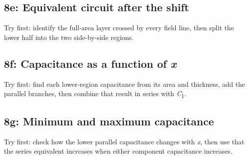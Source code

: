 \documentclass[11pt]{article}
\begin{document}
\begin{keepsection}
\begin{keepsection}
\subsection{8e: Equivalent circuit after the shift}

Try first: identify the full-area layer crossed by every field line, then split the lower half into the two side-by-side regions.

\end{keepsection}

\begin{keepsection}
\subsection{8f: Capacitance as a function of \textit{x}}

Try first: find each lower-region capacitance from its area and thickness, add the parallel branches, then combine that result in series with \textit{C}\textsubscript{1}.

\end{keepsection}

\begin{keepsection}
\subsection{8g: Minimum and maximum capacitance}

Try first: check how the lower parallel capacitance changes with \textit{x}, then use that the series equivalent increases when either component capacitance increases.

\end{keepsection}
\end{keepsection}


\clearpage
\end{document}
